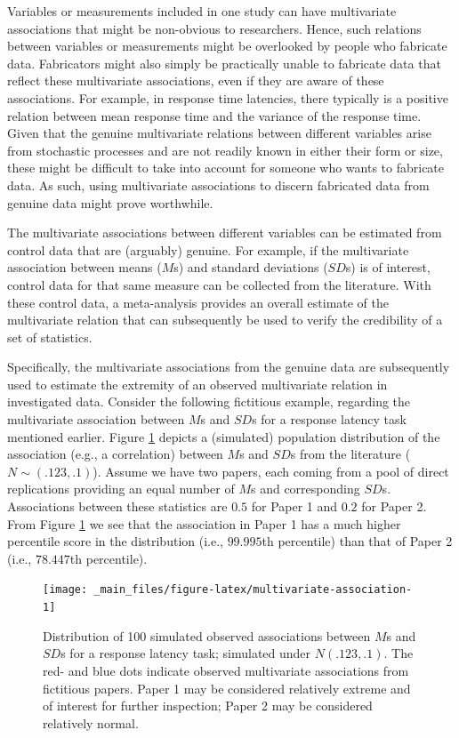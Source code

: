 \documentclass[a5paper]{book}
\begin{document}
Variables or measurements included in one study can have multivariate
associations that might be non-obvious to researchers. Hence, such
relations between variables or measurements might be overlooked by
people who fabricate data. Fabricators might also simply be practically
unable to fabricate data that reflect these multivariate associations,
even if they are aware of these associations. For example, in response
time latencies, there typically is a positive relation between mean
response time and the variance of the response time. Given that the
genuine multivariate relations between different variables arise from
stochastic processes and are not readily known in either their form or
size, these might be difficult to take into account for someone who
wants to fabricate data. As such, using multivariate associations to
discern fabricated data from genuine data might prove worthwhile.

The multivariate associations between different variables can be
estimated from control data that are (arguably) genuine. For example, if
the multivariate association between means (\(M\)s) and standard
deviations (\(SD\)s) is of interest, control data for that same measure
can be collected from the literature. With these control data, a
meta-analysis provides an overall estimate of the multivariate relation
that can subsequently be used to verify the credibility of a set of
statistics.

Specifically, the multivariate associations from the genuine data are
subsequently used to estimate the extremity of an observed multivariate
relation in investigated data. Consider the following fictitious
example, regarding the multivariate association between \(M\)s and
\(SD\)s for a response latency task mentioned earlier. Figure
\ref{fig:multivariate-association} depicts a (simulated) population
distribution of the association (e.g., a correlation) between \(M\)s and
\(SD\)s from the literature (\(N\sim(.123, .1)\)). Assume we have two
papers, each coming from a pool of direct replications providing an
equal number of \(M\)s and corresponding \(SD\)s. Associations between
these statistics are \(0.5\) for Paper 1 and \(0.2\) for Paper 2. From
Figure \ref{fig:multivariate-association} we see that the association in
Paper 1 has a much higher percentile score in the distribution (i.e.,
\(99.995\)th percentile) than that of Paper 2 (i.e., \(78.447\)th
percentile).

\begin{figure}

{\centering \texttt{[image: \_main\_files/figure-latex/multivariate-association-1]} 

}

\caption{Distribution of 100 simulated observed associations between $M$s and $SD$s for a response latency task; simulated under $N(.123,.1)$. The red- and blue dots indicate observed multivariate associations from fictitious papers. Paper 1 may be considered relatively extreme and of interest for further inspection; Paper 2 may be considered relatively normal.}\label{fig:multivariate-association}
\end{figure}
\end{document}
